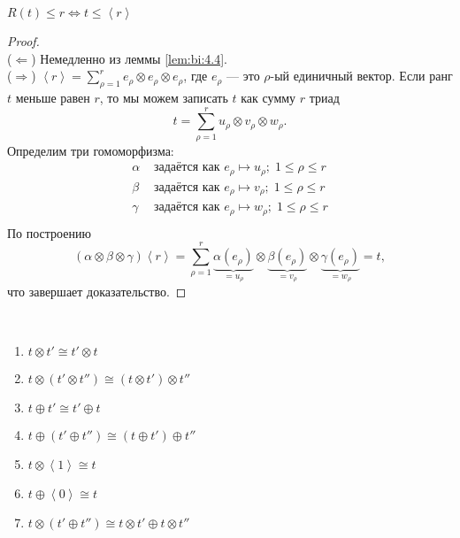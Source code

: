 \begin{lemma}\label{lem:bi:6.3}
  $R(t) \leq r \iff t \leq \left\langle r \right\rangle$
\end{lemma}
\begin{proof}\ \\
  ($\Longleftarrow$) Немедленно из леммы \ref{lem:bi:4.4}.\\
  ($\Longrightarrow$) $\left\langle r \right\rangle = \sum_{\rho = 1}^r e_{\rho} \otimes e_{\rho} \otimes e_{\rho}$, где $e_{\rho}$ --- это $\rho$-ый единичный вектор. Если ранг $t$ меньше равен $r$, то мы можем записать $t$ как сумму $r$ триад
\[
	t = \sum_{\rho=1}^r u_{\rho} \otimes v_{\rho} \otimes w_{\rho}.
\]
Определим три гомоморфизма:
\begin{align*}
	\alpha & \text{ задаётся как } e_{\rho} \mapsto u_{\rho}; \; 1 \leq \rho \leq r\\
	\beta & \text{ задаётся как } e_{\rho} \mapsto v_{\rho}; \; 1 \leq \rho \leq r\\
	\gamma & \text{ задаётся как } e_{\rho} \mapsto w_{\rho}; \; 1 \leq \rho \leq r\\
\end{align*}
По построению
\[
	(\alpha \otimes \beta \otimes \gamma)\left\langle r \right\rangle = \sum_{\rho=1}^r \underbrace{\alpha(e_{\rho})}_{=u_{\rho}} \otimes \underbrace{\beta(e_{\rho})}_{=v_{\rho}} \otimes \underbrace{\gamma(e_{\rho})}_{=w_{\rho}} = t,
\]
что завершает доказательство.
\end{proof}

\begin{observation}\ 
  \begin{enumerate}
       \item $t \otimes t' \cong t' \otimes t$
       \item $t \otimes (t' \otimes t'') \cong (t \otimes t') \otimes t''$
       \item $t \oplus t' \cong t' \oplus t$
       \item $t \oplus (t' \oplus t'') \cong (t \oplus t') \oplus t''$
       \item $t \otimes \left\langle 1 \right\rangle \cong t$
       \item $t \oplus \left\langle 0 \right\rangle \cong t$
       \item $t \otimes (t' \oplus t'') \cong t \otimes t' \oplus t \otimes t''$
  \end{enumerate}
\end{observation}

